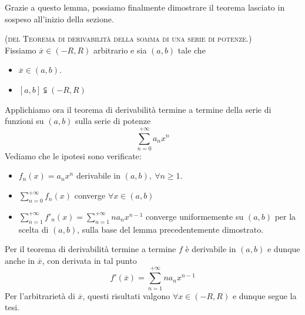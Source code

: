 Grazie a questo lemma, possiamo finalmente dimostrare il teorema lasciato in sospeso all'inizio della sezione.
\begin{demonstration}\textsc{(del Teorema di derivabilità della somma di una serie di potenze.)}\\%
	Fissiamo $\overline{x}\in\left(-R,R\right)$ arbitrario e sia $\left(a,b\right)$ tale che
	\begin{itemize}
		\item $\overline{x}\in\left(a,b\right)$.
		\item $\left[a,b\right]\subsetneqq\left(-R,R\right)$
	\end{itemize}
Applichiamo ora il teorema di derivabilità termine a termine della serie di funzioni su $\left(a,b\right)$ sulla serie di potenze
\begin{equation*}
	\sum_{n=0}^{+\infty}a_nx^n
\end{equation*}
Vediamo che le ipotesi sono verificate:
\begin{itemize}
	\item $f_n\left(x\right)=a_nx^n$ derivabile in $\left(a,b\right),\ \forall n\geq 1$.
	\item $\displaystyle\sum_{n=0}^{+\infty}f_n\left(x\right)$ converge $\forall x\in\left(a,b\right)$
	\item $\displaystyle\sum_{n=1}^{+\infty}f'_n\left(x\right)=\sum_{n=1}^{+\infty}na_nx^{n-1}$ converge uniformemente su $\left(a,b\right)$ per la scelta di $\left(a,b\right)$, sulla base del lemma precedentemente dimostrato.
\end{itemize}
Per il teorema di derivabilità termine a termine $f$ è derivabile in $\left(a,b\right)$ e dunque anche in $\overline{x}$, con derivata in tal punto
\begin{equation*}
	f'\left(\overline{x}\right)=\sum_{n=1}^{+\infty}na_nx^{n-1}
\end{equation*}
Per l'arbitrarietà di $\overline{x}$, questi risultati valgono $\forall x\in\left(-R,R\right)$ e dunque segue la tesi.
\end{demonstration}
